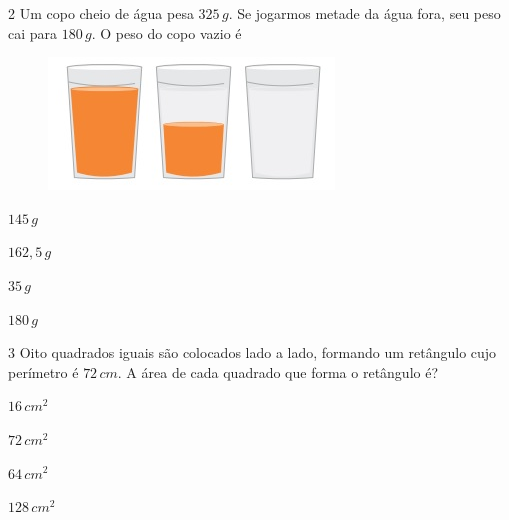 \num{2}  Um copo cheio de água pesa $325\,g$. Se jogarmos metade da água fora, seu
peso cai para $180\,g$. O peso do copo vazio é

\begin{figure}[h]
\centering\includegraphics[width=2.98958in,height=1.38542in]{./imgSAEB_6_MAT/media/image100.png}
\end{figure}

\begin{escolha}
\item $145\,g$
\item $162,5\,g$
\item $35\,g$
\item $180\,g$
\end{escolha}



\num{3}  Oito quadrados iguais são colocados lado a lado, formando um
retângulo cujo perímetro é $72\,cm$. A área de cada quadrado que forma o
retângulo é?

\begin{multicols}{2}
\begin{escolha}
\item $16\,cm^2$
\item $72\,cm^2$
\item $64\,cm^2$
\item $128\,cm^2$
\end{escolha}
\end{multicols}

